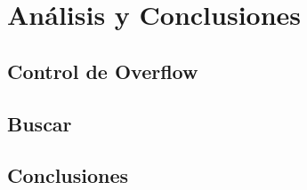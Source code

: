 \documentclass[letterpaper,10pt]{article}
\begin{document}
	\newpage

	\section{Análisis y Conclusiones}

	\subsection{Control de Overflow}

	\subsection{Buscar}

	\subsection{Conclusiones}
\end{document}
